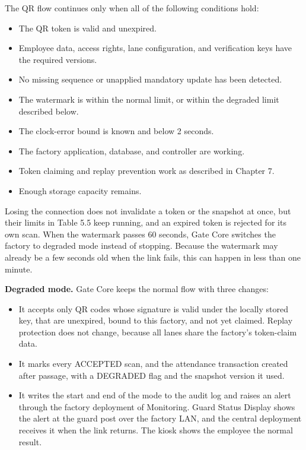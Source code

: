 The QR flow continues only when all of the following conditions hold:


\begin{itemize}[leftmargin=36pt, itemsep=2pt, topsep=4pt, parsep=2pt]

  \item The QR token is valid and unexpired.

  \item Employee data, access rights, lane configuration, and verification keys have the required versions.

  \item No missing sequence or unapplied mandatory update has been detected.

  \item The watermark is within the normal limit, or within the degraded limit described below.

  \item The clock-error bound is known and below 2 seconds.

  \item The factory application, database, and controller are working.

  \item Token claiming and replay prevention work as described in Chapter 7.

  \item Enough storage capacity remains.

\end{itemize}

Losing the connection does not invalidate a token or the snapshot at once, but their limits in Table 5.5 keep running, and an expired token is rejected for its own scan. When the watermark passes 60 seconds, Gate Core switches the factory to degraded mode instead of stopping. Because the watermark may already be a few seconds old when the link fails, this can happen in less than one minute.


\textbf{Degraded mode.} Gate Core keeps the normal flow with three changes:

\begin{itemize}[leftmargin=36pt, itemsep=2pt, topsep=4pt, parsep=2pt]

  \item It accepts only QR codes whose signature is valid under the locally stored key, that are unexpired, bound to this factory, and not yet claimed. Replay protection does not change, because all lanes share the factory's token-claim data.

  \item It marks every ACCEPTED scan, and the attendance transaction created after passage, with a DEGRADED flag and the snapshot version it used.

  \item It writes the start and end of the mode to the audit log and raises an alert through the factory deployment of Monitoring. Guard Status Display shows the alert at the guard post over the factory LAN, and the central deployment receives it when the link returns. The kiosk shows the employee the normal result.

\end{itemize}

